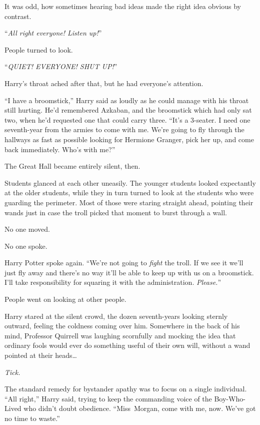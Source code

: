 It was odd, how sometimes hearing bad ideas made the right idea obvious by
contrast.

“\emph{All right everyone! Listen up!}”

People turned to look.

“\emph{QUIET! EVERYONE! SHUT UP!}”

Harry’s throat ached after that, but he had everyone’s attention.

“I have a broomstick,” Harry said as loudly as he could manage with his throat
still hurting. He’d remembered Azkaban, and the broomstick which had only sat
two, when he’d requested one that could carry three. “It’s a 3-seater. I need
one seventh-year from the armies to come with me. We’re going to fly through
the hallways as fast as possible looking for Hermione Granger, pick her up, and
come back immediately. Who’s with me?”

The Great Hall became entirely silent, then.

\later

Students glanced at each other uneasily. The younger students looked
expectantly at the older students, while they in turn turned to look at the
students who were guarding the perimeter. Most of those were staring straight
ahead, pointing their wands just in case the troll picked that moment to burst
through a wall.

No one moved.

No one spoke.

Harry Potter spoke again. “We’re not going to \emph{fight} the troll. If we see
it we’ll just fly away and there’s no way it’ll be able to keep up with us on a
broomstick. I’ll take responsibility for squaring it with the administration.
\emph{Please.}”

People went on looking at other people.

\later

Harry stared at the silent crowd, the dozen seventh-years looking sternly
outward, feeling the coldness coming over him. Somewhere in the back of his
mind, Professor Quirrell was laughing scornfully and mocking the idea that
ordinary fools would ever do something useful of their own will, without a wand
pointed at their heads…

\emph{Tick.}

The standard remedy for bystander apathy was to focus on a single individual.
“All right,” Harry said, trying to keep the commanding voice of the
Boy-Who-Lived who didn’t doubt obedience. “Miss~Morgan, come with me, now.
We’ve got no time to waste.”

